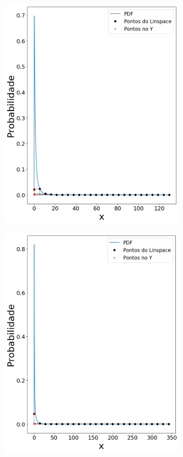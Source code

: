\begin{figure}[H]
\begin{subfigure}[b]{0.3\textwidth}
		\includegraphics[width=\textwidth]{./figuras/lognormal_125}
		\caption{}
		\label{fig:lin125}
	\end{subfigure}
	\hfill
	\begin{subfigure}[b]{0.3\textwidth}
		\centering 
		\includegraphics[width=\textwidth]{./figuras/lognormal_15}

\end{subfigure}
\end{figure}
